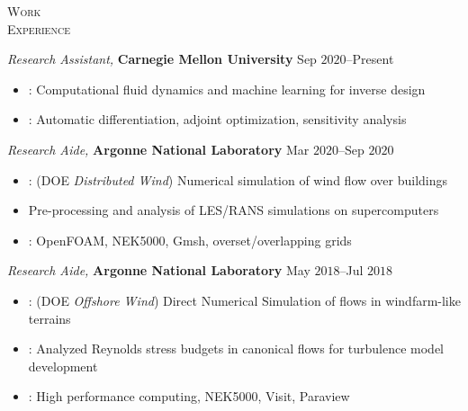 \documentclass[10pt]{article}
\begin{document}
\vspace{-1.5em}
\begin{multicols}{2}
\textsc{Work \\ Experience}
\columnbreak

\textit{Research Assistant,} \textbf{Carnegie Mellon University} \hfill Sep $2020$--Present

\vspace{-1.75em}
\begin{itemize}[label=-]
    \setlength\itemsep{-0.25em}
    \setlength{\itemindent}{-1.50em}
    \item {}: Computational fluid dynamics and machine learning for inverse design
    \item {}: Automatic differentiation, adjoint optimization, sensitivity analysis
\end{itemize}
\vspace{-2.0em}

\vspace{0.5em}
%
\textit{Research Aide,} \textbf{Argonne National Laboratory} \hfill Mar $2020$--Sep $2020$

\vspace{-1.75em}
\begin{itemize}[label=-]
    \setlength\itemsep{-0.25em}
    \setlength{\itemindent}{-1.50em}
    \item {}: (DOE \textit{Distributed Wind}) Numerical simulation of wind flow over buildings
    \item {} Pre-processing and analysis of LES/RANS simulations on supercomputers
    \item {}: OpenFOAM, NEK5000, Gmsh, overset/overlapping grids
\end{itemize}
\vspace{-2.0em}

\vspace{0.5em}
%
\textit{Research Aide,} \textbf{Argonne National Laboratory} \hfill May $2018$--Jul $2018$

\vspace{-1.75em}
\begin{itemize}[label=-]
    \setlength\itemsep{-0.25em}
    \setlength{\itemindent}{-1.50em}
    \item {}: (DOE \textit{Offshore Wind}) Direct Numerical Simulation of flows in windfarm-like terrains
    \item {}: Analyzed Reynolds stress budgets in canonical flows for turbulence model development
    \item {}: High performance computing, NEK5000, Visit, Paraview
\end{itemize}
\vspace{-2.0em}


\end{multicols}
\end{document}

